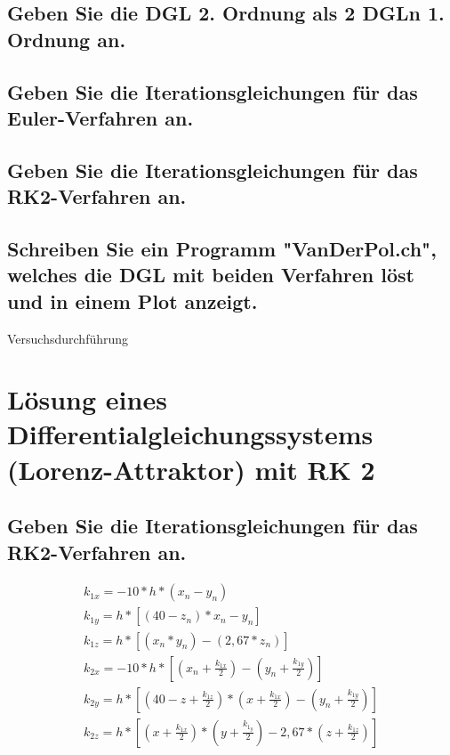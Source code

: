 \documentclass[10pt,a4paper]{article}
\begin{document}
\subsection{Geben Sie die DGL 2. Ordnung als 2 DGLn 1. Ordnung an.}

\subsection{Geben Sie die Iterationsgleichungen für das Euler-Verfahren an.}

\subsection{Geben Sie die Iterationsgleichungen für das RK2-Verfahren an.}

\subsection{Schreiben Sie ein Programm "VanDerPol.ch", welches die DGL mit beiden
Verfahren löst und in einem Plot anzeigt.}

\begin{center}
\begin{large}
Versuchsdurchführung
\end{large}
\end{center}

\section{Lösung eines Differentialgleichungssystems (Lorenz-Attraktor) mit RK 2}
\subsection{Geben Sie die Iterationsgleichungen für das RK2-Verfahren an.}
\begin{subequations}
\begin{align}
k_{1x} = -10 * h * (x_n - y_n)\\
k_{1y} = h * [(40-z_n) * x_n - y_n]\\
k_{1z} = h * [(x_n * y_n) - (2,67 * z_n)]\\
k_{2x} = -10 * h * [(x_n +\frac{k_{1x}}{2}) - (y_n + \frac{k_{1y}}{2})]\\
k_{2y} = h * [(40 - z + \frac{k_{1z}}{2}) * (x + \frac{k_{1x}}{2}) - (y_n + \frac{k_{1y}}{2})]\\
k_{2z} = h * [(x + \frac{k_{1x}}{2}) * (y + \frac{k_{1_y}}{2}) - 2,67 * (z + \frac{k_{1z}}{2})]
\end{align}
\end{subequations}
\end{document}
